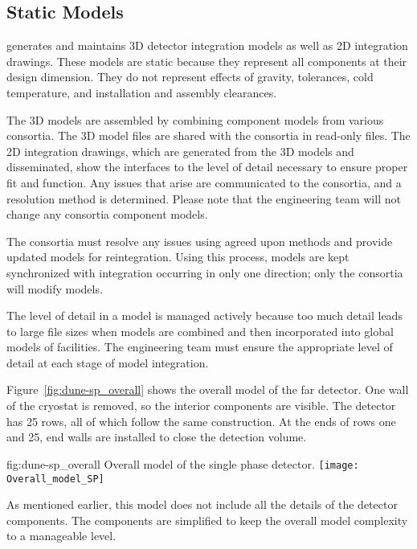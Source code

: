 \subsection{Static Models}
\label{sec:fdsp-coord-integ-static}

  generates and maintains 3D detector
integration models as well as 2D integration drawings. These models
are static because they represent all components at their design
dimension. They do not represent effects of gravity, tolerances, cold
temperature, and installation and assembly clearances.


The 3D models are assembled by combining component models from various
consortia. The 3D model files are shared with the consortia in
read-only files. The 2D integration drawings, which are generated from
the 3D models and disseminated, show the interfaces to the level of
detail necessary to ensure proper fit and function. Any issues that
arise are communicated to the consortia, and a resolution method is
determined. Please note that the  engineering team will not
change any consortia component models.


The consortia must resolve any issues using agreed upon methods and
provide updated models for reintegration. Using this process, models
are kept synchronized with integration occurring in only one
direction; only the consortia will modify models.


The level of detail in a model is managed actively because too much detail leads to large file sizes when models are combined and
then incorporated into global models of facilities. The  engineering team must ensure the
appropriate level of detail at each stage of model
integration.


Figure~\ref{fig:dune-sp_overall} shows the overall model of the  far detector. One wall of the cryostat is removed, so the interior
components are visible. The detector has 25 rows, all of which follow
the same construction. At the ends of rows one and 25, end
walls are installed to close the detection volume.
\begin{dunefigure}{fig:dune-sp_overall}
  {Overall model of the single phase detector.}
  \texttt{[image: Overall\_model\_SP]}
\end{dunefigure}
As mentioned earlier, this model does not include all the details of
the detector components. The components are simplified to keep the
overall model complexity to a manageable level.


